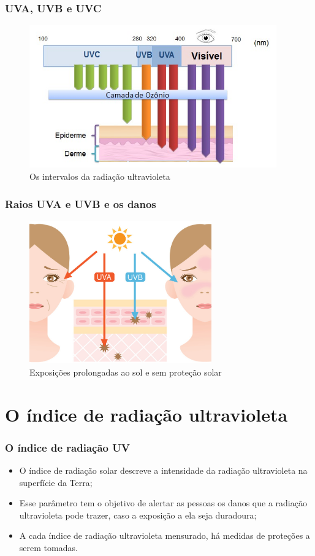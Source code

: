 \documentclass{beamer}
\begin{document}
	
	\begin{frame}
		\frametitle{UVA, UVB e UVC} 
			\begin{figure}[htb]
				\includegraphics[width=0.95\textwidth]{img/uvlight_spectrum1.jpg}
				\caption{Os intervalos da radiação ultravioleta}
			\end{figure}	
	\end{frame}
	
	\begin{frame}
		\frametitle{Raios UVA e UVB e os danos} 
			\begin{figure}[htb]
				\includegraphics[width=0.70\textwidth]{img/raio_uva_uvb.jpg}
				\caption{Exposições prolongadas ao sol e sem proteção solar}
			\end{figure}
			
	\end{frame}
	
	
	\section{O índice de radiação ultravioleta}
		\begin{frame}
			\frametitle{O índice de radiação UV} 
			\begin{itemize}
				\item O índice de radiação solar descreve a intensidade da radiação ultravioleta na superfície da Terra;
				\item Esse parâmetro tem o objetivo de alertar as pessoas os danos que a radiação ultravioleta pode trazer, caso a exposição a ela seja duradoura;
				\item A cada índice de radiação ultravioleta mensurado, há medidas de proteções a serem tomadas.
			\end{itemize}
		\end{frame} 
			
\end{document}
